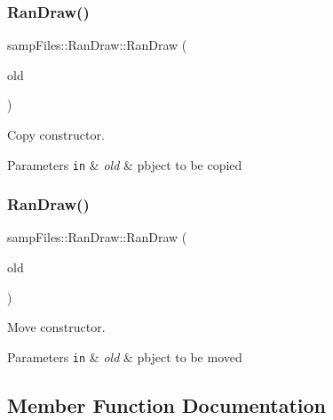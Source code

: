 \subsubsection{\texorpdfstring{Ran\+Draw()}{RanDraw()}\hspace{0.1cm}{\footnotesize\ttfamily [2/3]}}
{\footnotesize\ttfamily samp\+Files\+::\+Ran\+Draw\+::\+Ran\+Draw (\begin{DoxyParamCaption}\item[{const \hyperlink{classsamp_files_1_1_ran_draw}{Ran\+Draw} \&}]{old }\end{DoxyParamCaption})\hspace{0.3cm}{\ttfamily [default]}}



Copy constructor. 


\begin{DoxyParams}[1]{Parameters}
\mbox{\tt in}  & {\em old} & pbject to be copied \\
\hline
\end{DoxyParams}
\mbox{\label{classsamp_files_1_1_ran_draw_a9d840323058ba8db43a775a97254b640}} 
\subsubsection{\texorpdfstring{Ran\+Draw()}{RanDraw()}\hspace{0.1cm}{\footnotesize\ttfamily [3/3]}}
{\footnotesize\ttfamily samp\+Files\+::\+Ran\+Draw\+::\+Ran\+Draw (\begin{DoxyParamCaption}\item[{\hyperlink{classsamp_files_1_1_ran_draw}{Ran\+Draw} \&\&}]{old }\end{DoxyParamCaption})\hspace{0.3cm}{\ttfamily [default]}}



Move constructor. 


\begin{DoxyParams}[1]{Parameters}
\mbox{\tt in}  & {\em old} & pbject to be moved \\
\hline
\end{DoxyParams}


\subsection{Member Function Documentation}
\mbox{\label{classsamp_files_1_1_ran_draw_a6cdfbab1e544fdb15fca3ee4a25d4020}} 
